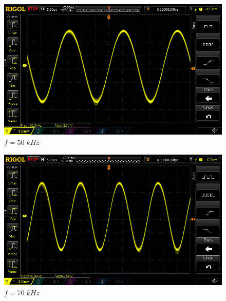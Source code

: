 \documentclass[uplatex,a4paper,11pt,oneside,openany]{jsbook}
\begin{document}
\begin{spacing}{0.67}
  \begin{multicols}{2}
    \begin{figure}[H]
       \centering
        \includegraphics[keepaspectratio, scale=0.28, angle=0]
                    {rigol/figs/FrqCharM1Y1_2kR/50khz.png}
                    \caption{$f=50\;kHz$}
                    \label{fig:frq50k}
    \end{figure}
  
    \begin{figure}[H]
       \centering
        \includegraphics[keepaspectratio, scale=0.28, angle=0]
                  {rigol/figs/FrqCharM1Y1_2kR/70khz.png}
                  \caption{$f=70\;kHz$}
                  \label{fig:frq70k}
    \end{figure}
  \end{multicols}


\end{spacing}
\end{document}
